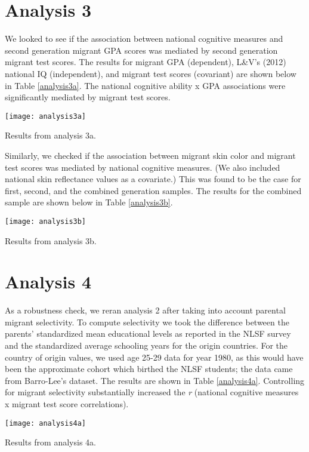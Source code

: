 \documentclass[a4paper,12pt]{article}
\begin{document}
\section{Analysis 3}
We looked to see if the association between national cognitive measures and second generation migrant GPA scores was mediated by second generation migrant test scores. The results for migrant GPA (dependent), L\&V's (2012) national IQ (independent), and migrant test scores (covariant) are shown below in Table \ref{analysis3a}. The national cognitive ability x GPA associations were significantly mediated by migrant test scores.

\begin{table}[H]
\centering
\texttt{[image: analysis3a]}
\caption{Results from analysis 3a.}\label{analysis3a}
\end{table}

Similarly, we checked if the association between migrant skin color and migrant test scores was mediated by national cognitive measures. (We also included national skin reflectance values as a covariate.) This was found to be the case for first, second, and the combined generation samples. The results for the combined sample are shown below in Table \ref{analysis3b}.

\begin{table}[H]
\centering
\texttt{[image: analysis3b]}
\caption{Results from analysis 3b.}\label{analysis3b}
\end{table}

\section{Analysis 4}
As a robustness check, we reran analysis 2 after taking into account parental migrant selectivity. To compute selectivity we took the difference between the parents' standardized mean educational levels as reported in the NLSF survey and the standardized average schooling years for the origin countries. For the country of origin values, we used age 25-29 data for year 1980, as this would have been the approximate cohort which birthed the NLSF students; the data came from Barro-Lee's dataset. The results are shown in Table \ref{analysis4a}. Controlling for migrant selectivity substantially increased the \textit{r} (national cognitive measures x migrant test score correlations).

\begin{table}[H]
\centering
\texttt{[image: analysis4a]}
\caption{Results from analysis 4a.}\label{analysis4a}
\end{table}
\end{document}

